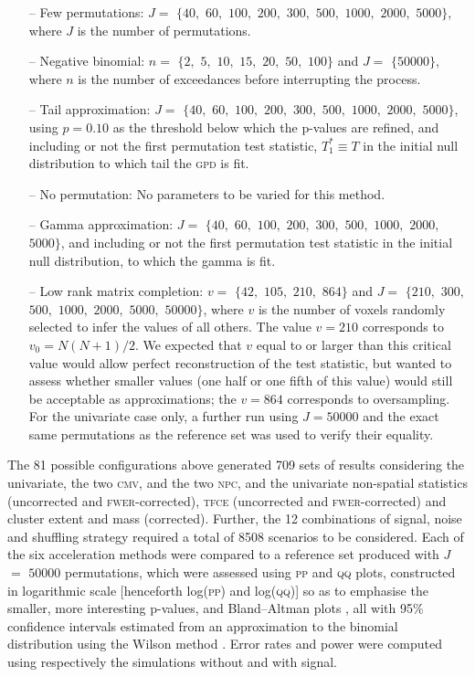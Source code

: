 \begin{itemize}%
\item[--] Few permutations: $J =$ $\{40,$ $60,$ $100,$ $200,$ $300,$ $500,$ $1000,$ $2000,$ $5000\}$, where $J$ is the number of permutations.
\item[--] Negative binomial: $n =$ $\{2,$ $5,$ $10,$ $15,$ $20,$ $50,$ $100\}$ and $J =$ $\{50000\}$, where $n$ is the number of exceedances before interrupting the process.
\item[--] Tail approximation: $J =$ $\{40,$ $60,$ $100,$ $200,$ $300,$ $500,$ $1000,$ $2000,$ $5000\}$, using $p=0.10$ as the threshold below which the p-values are refined, and including or not the first permutation test statistic, $T^*_1 \equiv T$ in the initial null distribution to which tail the \textsc{gpd} is fit.
\item[--] No permutation: No parameters to be varied for this method.
\item[--] Gamma approximation: $J =$ $\{40,$ $60,$ $100,$ $200,$ $300,$ $500,$ $1000,$ $2000,$ $5000\}$, and including or not the first permutation test statistic in the initial null distribution, to which the gamma is fit.
\item[--] Low rank matrix completion: $v =$ $\{42,$ $105,$ $210,$ $864\}$ and $J =$ $\{210,$ $300,$ $500,$ $1000,$ $2000,$ $5000,$ $50000\}$, where $v$ is the number of voxels randomly selected to infer the values of all others. The value $v=210$ corresponds to $v_0=N(N+1)/2$. We expected that $v$ equal to or larger than this critical value would allow perfect reconstruction of the test statistic, but wanted to assess whether smaller values (one half or one fifth of this value) would still be acceptable as approximations; the $v=864$ corresponds to oversampling. For the univariate case only, a further run using $J=50000$ and the exact same permutations as the reference set was used to verify their equality.
\end{itemize}

The 81 possible configurations above generated 709 sets of results considering the univariate, the two \textsc{cmv}, and the two \textsc{npc}, and the univariate non-spatial statistics (uncorrected and \textsc{fwer}-corrected), \textsc{tfce} (uncorrected and \textsc{fwer}-corrected) and cluster extent and mass (corrected). Further, the 12 combinations of signal, noise and shuffling strategy required a total of 8508 scenarios to be considered. Each of the six acceleration methods were compared to a reference set produced with $J$ $=$ $50000$ permutations, which were assessed using \textsc{pp} and \textsc{qq} plots, constructed in logarithmic scale [henceforth log(\textsc{pp}) and log(\textsc{qq})] so as to emphasise the smaller, more interesting p-values, and Bland--Altman plots \citep{Bland1986}, all with 95\% confidence intervals estimated from an approximation to the binomial distribution using the Wilson method \citep{Wilson1927}. Error rates and power were computed using respectively the simulations without and with signal.

